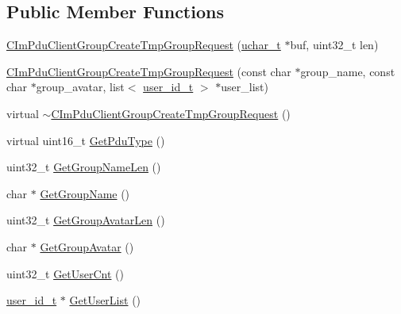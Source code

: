 \subsection*{Public Member Functions}
\begin{DoxyCompactItemize}
\item 
\hyperlink{class_c_im_pdu_client_group_create_tmp_group_request_a620ca380783e284af471c8de60d3cf76}{C\+Im\+Pdu\+Client\+Group\+Create\+Tmp\+Group\+Request} (\hyperlink{base_2ostype_8h_a124ea0f8f4a23a0a286b5582137f0b8d}{uchar\+\_\+t} $\ast$buf, uint32\+\_\+t len)
\item 
\hyperlink{class_c_im_pdu_client_group_create_tmp_group_request_a7764d0ae3305a98f49600f29139aafe2}{C\+Im\+Pdu\+Client\+Group\+Create\+Tmp\+Group\+Request} (const char $\ast$group\+\_\+name, const char $\ast$group\+\_\+avatar, list$<$ \hyperlink{structuser__id__t}{user\+\_\+id\+\_\+t} $>$ $\ast$user\+\_\+list)
\item 
virtual \hyperlink{class_c_im_pdu_client_group_create_tmp_group_request_a86c213eeb5aa9326580f80805d7074f1}{$\sim$\+C\+Im\+Pdu\+Client\+Group\+Create\+Tmp\+Group\+Request} ()
\item 
virtual uint16\+\_\+t \hyperlink{class_c_im_pdu_client_group_create_tmp_group_request_a80e38c0d2a44b6378af9ff093acaddc7}{Get\+Pdu\+Type} ()
\item 
uint32\+\_\+t \hyperlink{class_c_im_pdu_client_group_create_tmp_group_request_a13f43daa3bf3a73bd541b6632d2a2cd0}{Get\+Group\+Name\+Len} ()
\item 
char $\ast$ \hyperlink{class_c_im_pdu_client_group_create_tmp_group_request_a293fde4b5f3f85e1589b50a0f50ae8b2}{Get\+Group\+Name} ()
\item 
uint32\+\_\+t \hyperlink{class_c_im_pdu_client_group_create_tmp_group_request_a68a6f08588e5797033176eb453afb019}{Get\+Group\+Avatar\+Len} ()
\item 
char $\ast$ \hyperlink{class_c_im_pdu_client_group_create_tmp_group_request_af236e1a6b346bbb51e9612b716298ed7}{Get\+Group\+Avatar} ()
\item 
uint32\+\_\+t \hyperlink{class_c_im_pdu_client_group_create_tmp_group_request_abd669900254730a9952e52ac88b47c73}{Get\+User\+Cnt} ()
\item 
\hyperlink{structuser__id__t}{user\+\_\+id\+\_\+t} $\ast$ \hyperlink{class_c_im_pdu_client_group_create_tmp_group_request_ac6d1677c2a1a33fa9249a2737747c75b}{Get\+User\+List} ()
\end{DoxyCompactItemize}
